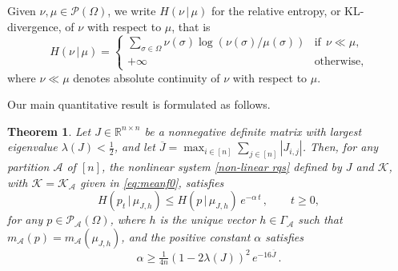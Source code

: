 \documentclass[11pt,reqno]{amsart}
\numberwithin{equation}{section}
\numberwithin{figure}{section}
\newtheorem{theorem}{Theorem}[section]
\renewcommand{\geq}{\ge} %
\newcommand{\1}{\mathds{1}}
\let\a=\alpha \let\b=\beta \let\g=\gamma \let\d=\delta
\let\si=\sigma
\let\O=\Omega
\let\G=\Gamma
\newcommand{\cA}{\ensuremath{\mathcal A}}
\newcommand{\cK}{\ensuremath{\mathcal K}}
\newcommand{\cP}{\ensuremath{\mathcal P}}
\newcommand{\bbR}{{\ensuremath{\mathbb R}} }
\begin{document}
Given $\nu,\mu\in\cP(\O)$, we write $H(\nu\,|\,\mu)$ for the relative entropy, or KL-divergence,  of $\nu$ with respect to $\mu$, that is  
\begin{equation}\label{relative entropy1}
    H(\nu\,|\,\mu) =
\begin{cases}
    \sum_{\si\in\O}\nu(\si)\log(\nu(\si)/\mu(\si)) & \text{if} \ \ \nu \ll \mu, \\
    +\infty & \text{otherwise},
\end{cases}
\end{equation}
where $\nu\ll \mu$ denotes absolute continuity of $\nu$ with respect to $\mu$. 


Our main quantitative result is formulated as follows.   
 \begin{theorem}\label{Central Theorem} 
Let \(J\in\bbR^{n\times n}\) be a nonnegative definite matrix with largest eigenvalue \(\lambda(J) < \frac{1}{2}\), and let  \(\overline{J}=\max_{i\in [n]} \sum_{j\in [n]}|J_{i,j}|\). 
Then, %
for any partition $\cA$ of $[n]$, the nonlinear system \eqref{non-linear rqs} defined by $J$ and $\cK$, with $\cK=\cK_\cA$ given in \eqref{eq:meanf0}, satisfies 
\begin{equation}\label{relative entropy01}
    H(p_t\,|\,\mu_{J,h}) \le H(p\,|\,\mu_{J,h})\,e^{-\a\, t}\,,\qquad t\ge 0, 
\end{equation}
for any $p\in \mathcal{P}_\cA(\Omega)$, where $h$ is the unique vector $h\in\G_\cA$ such that %
$m_\cA(p) = m_\cA(\mu_{J,h})$, and the positive constant $\a$ satisfies 
  \begin{equation}
        \alpha \geq \tfrac1{4n}(1 - 2\lambda(J))^2\,e^{-16\overline{J}}
\,.        %
   \end{equation}
\end{theorem}
\end{document}
